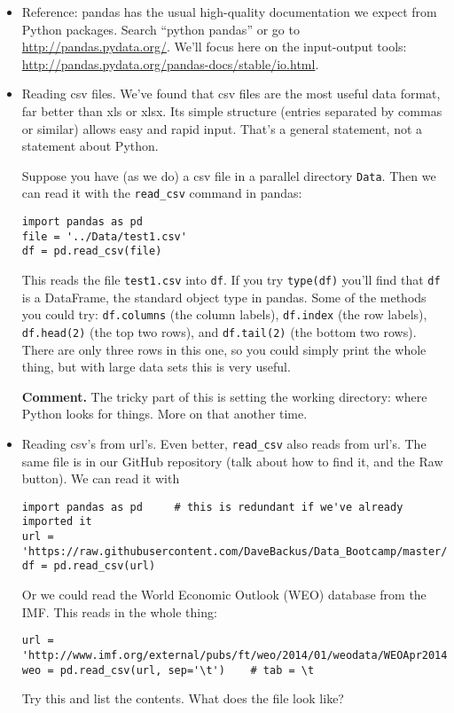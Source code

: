 \documentclass[11pt]{article}
\begin{document}
\begin{itemize}
\item Reference:  pandas has the usual high-quality
{documentation}
we expect from Python packages.
Search ``python pandas'' or go to
\url{http://pandas.pydata.org/}.
We'll focus here on the input-output tools:
\url{http://pandas.pydata.org/pandas-docs/stable/io.html}.

\item Reading csv files.  We've found that csv files
are the most useful data format, far better than xls or xlsx.
Its simple structure (entries separated by commas or similar) allows easy and rapid input.
That's a general statement, not a statement about Python.  

Suppose you have (as we do) a csv file in a parallel directory {\tt Data}.
Then we can read it with the \verb:read_csv: command in pandas:
\begin{verbatim}
import pandas as pd
file = '../Data/test1.csv'
df = pd.read_csv(file)
\end{verbatim}
This reads the file {\tt test1.csv} into {\tt df}.
If you try {\tt type(df)} you'll find that {\tt df} is a DataFrame,
the standard object type in pandas.
Some of the methods you could try:
{\tt df.columns} (the column labels),
{\tt df.index} (the row labels),
{\tt df.head(2)} (the top two rows),
and {\tt df.tail(2)} (the bottom two rows).
There are only three rows in this one, so you could simply
print the whole thing, but with large data sets this is very useful.

{\bf Comment.}
The tricky part of this is setting the working directory:
where Python looks for things. 
More on that another time.   


\item Reading csv's from url's.  
Even better, {\tt read\_csv} also reads from url's.
The same file is in our GitHub repository (talk about how to find it,
and the Raw button).
We can read it with
\begin{verbatim}
import pandas as pd     # this is redundant if we've already imported it
url = 'https://raw.githubusercontent.com/DaveBackus/Data_Bootcamp/master/Code/Data/test1.csv'
df = pd.read_csv(url)
\end{verbatim}
Or we could read the World Economic Outlook (WEO) database from the IMF.
This reads in the whole thing:
\begin{verbatim}
url = 'http://www.imf.org/external/pubs/ft/weo/2014/01/weodata/WEOApr2014all.xls'
weo = pd.read_csv(url, sep='\t')    # tab = \t
\end{verbatim}
Try this and list the contents.
What does the file look like?


\end{itemize}
\end{document}
